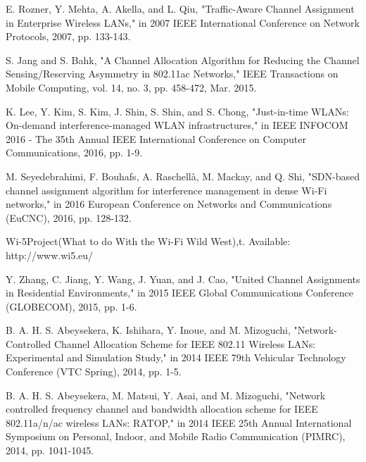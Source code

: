 \begin{thebibliography}{1}
 E. Rozner, Y. Mehta, A. Akella, and L. Qiu, "Traffic-Aware Channel Assignment in Enterprise Wireless LANs," in 2007 IEEE International Conference on Network Protocols, 2007, pp. 133-143.

 S. Jang and S. Bahk, "A Channel Allocation Algorithm for Reducing the Channel Sensing/Reserving Asymmetry in 802.11ac Networks," IEEE Transactions on Mobile Computing, vol. 14, no. 3, pp. 458-472, Mar. 2015.

 K. Lee, Y. Kim, S. Kim, J. Shin, S. Shin, and S. Chong, "Just-in-time WLANs: On-demand interference-managed WLAN infrastructures," in IEEE INFOCOM 2016 - The 35th Annual IEEE International Conference on Computer Communications, 2016, pp. 1-9.

 M. Seyedebrahimi, F. Bouhafs, A. Raschellà, M. Mackay, and Q. Shi, "SDN-based channel assignment algorithm for interference management in dense Wi-Fi networks," in 2016 European Conference on Networks and Communications (EuCNC), 2016, pp. 128-132.

 Wi-5Project(What to do With the Wi-Fi Wild West),t. Available: http://www.wi5.eu/

 Y. Zhang, C. Jiang, Y. Wang, J. Yuan, and J. Cao, "United Channel Assignments in Residential Environments," in 2015 IEEE Global Communications Conference (GLOBECOM), 2015, pp. 1-6.



 B. A. H. S. Abeysekera, K. Ishihara, Y. Inoue, and M. Mizoguchi, "Network-Controlled Channel Allocation Scheme for IEEE 802.11 Wireless LANs: Experimental and Simulation Study," in 2014 IEEE 79th Vehicular Technology Conference (VTC Spring), 2014, pp. 1-5.

 B. A. H. S. Abeysekera, M. Matsui, Y. Asai, and M. Mizoguchi, "Network controlled frequency channel and bandwidth allocation scheme for IEEE 802.11a/n/ac wireless LANs: RATOP," in 2014 IEEE 25th Annual International Symposium on Personal, Indoor, and Mobile Radio Communication (PIMRC), 2014, pp. 1041-1045.


\end{thebibliography}
